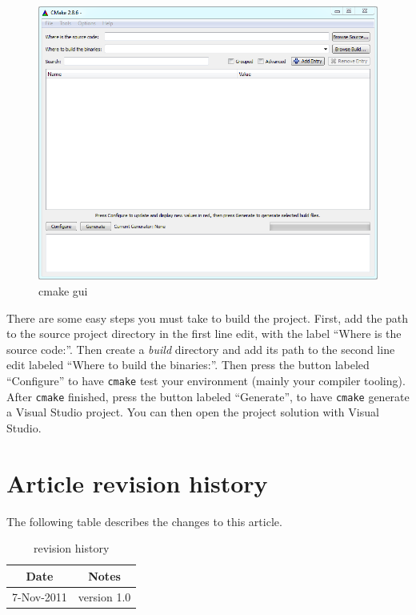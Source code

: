 \documentclass[12pt,a4paper]{article}
\begin{document}
\begin{figure}[t]
\centering
\includegraphics[width=\linewidth]{cmake_gui.png}
\caption{cmake gui}
\end{figure}

There are some easy steps you must take to build the project. First, add the path to the source project directory in the first line edit, with the label ``Where is the source code:''. Then create a \emph{build} directory and add its path to the second line edit labeled ``Where to build the binaries:''. Then press the button labeled ``Configure'' to have \verb+cmake+ test your environment (mainly your compiler tooling). After \verb+cmake+ finished, press the button labeled ``Generate'', to have \verb+cmake+ generate a Visual Studio project. You can then open the project solution with Visual Studio. 

\section{Article revision history}
The following table describes the changes to this article.
\begin{table}[htdp]
\caption{revision history}
\begin{center}
\begin{tabular}{|c|c|}
\hline
Date & Notes \\
\hline
7-Nov-2011 & version 1.0\\
\hline
\end{tabular}
\end{center}
\label{default}
\end{table}%
\end{document}
